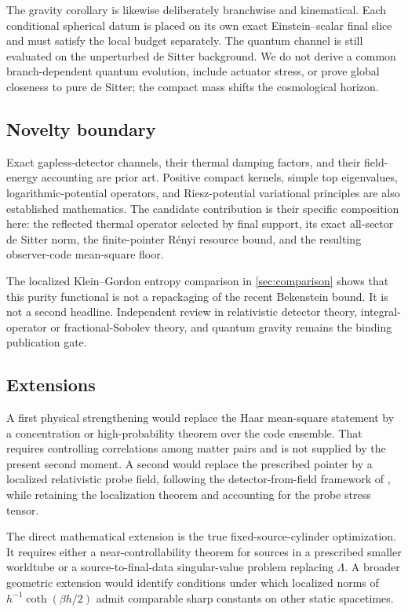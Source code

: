 The gravity corollary is likewise deliberately branchwise and kinematical.
Each conditional spherical datum is placed on its own exact
Einstein--scalar final slice and must satisfy the local budget separately.
The quantum channel is still evaluated on the unperturbed de Sitter
background.  We do not derive a common branch-dependent quantum evolution,
include actuator stress, or prove global closeness to pure de Sitter; the
compact mass shifts the cosmological horizon.

\subsection{Novelty boundary}

Exact gapless-detector channels, their thermal damping factors, and their
field-energy accounting are prior art.  Positive compact kernels, simple top
eigenvalues, logarithmic-potential operators, and Riesz-potential
variational principles are also established mathematics.  The candidate
contribution is their specific composition here: the reflected thermal
operator selected by final support, its exact all-sector de Sitter norm, the
finite-pointer R\'enyi resource bound, and the resulting observer-code
mean-square floor.

The localized Klein--Gordon entropy comparison in \cref{sec:comparison}
shows that this purity functional is not a repackaging of the recent
Bekenstein bound.  It is not a second headline.  Independent review in
relativistic detector theory, integral-operator or fractional-Sobolev theory,
and quantum gravity remains the binding publication gate.

\subsection{Extensions}

A first physical strengthening would replace the Haar mean-square statement
by a concentration or high-probability theorem over the code ensemble.  That
requires controlling correlations among matter pairs and is not supplied by
the present second moment.  A second would replace the prescribed pointer by
a localized relativistic probe field, following the detector-from-field
framework of \cite{PercheEtAl2024}, while retaining the localization theorem
and accounting for the probe stress tensor.

The direct mathematical extension is the true fixed-source-cylinder
optimization.  It requires either a near-controllability theorem for sources
in a prescribed smaller worldtube or a source-to-final-data singular-value
problem replacing $\Lambda$.  A broader geometric extension would identify
conditions under which localized norms of
$h^{-1}\coth(\beta h/2)$ admit comparable sharp constants on other static
spacetimes.

